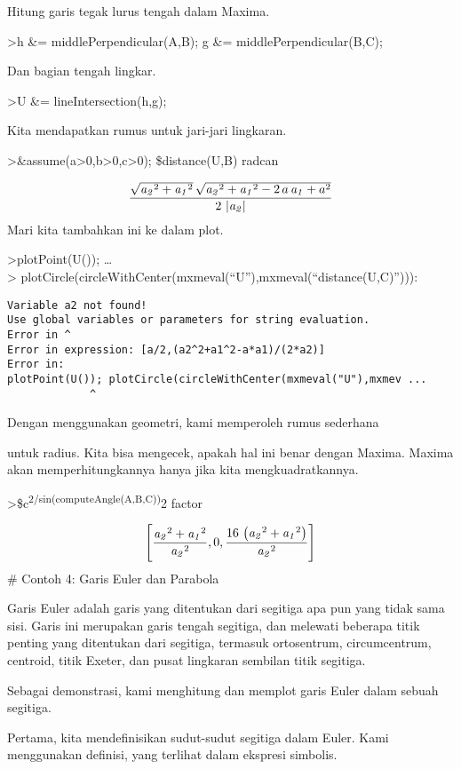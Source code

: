 \documentclass[
]{book}
\begin{document}
Hitung garis tegak lurus tengah dalam Maxima.

\textgreater h \&= middlePerpendicular(A,B); g \&= middlePerpendicular(B,C);

Dan bagian tengah lingkar.

\textgreater U \&= lineIntersection(h,g);

Kita mendapatkan rumus untuk jari-jari lingkaran.

\textgreater\&assume(a\textgreater0,b\textgreater0,c\textgreater0); \$distance(U,B) \textbar{} radcan

\[\frac{\sqrt{{\it a_2}^2+{\it a_1}^2}\,\sqrt{{\it a_2}^2+{\it a_1}^2
 -2\,a\,{\it a_1}+a^2}}{2\,\left| {\it a_2}\right| }\]Mari kita tambahkan ini ke dalam plot.

\textgreater plotPoint(U()); \ldots{}\\
\textgreater{} plotCircle(circleWithCenter(mxmeval(``U''),mxmeval(``distance(U,C)''))):

\begin{verbatim}
Variable a2 not found!
Use global variables or parameters for string evaluation.
Error in ^
Error in expression: [a/2,(a2^2+a1^2-a*a1)/(2*a2)]
Error in:
plotPoint(U()); plotCircle(circleWithCenter(mxmeval("U"),mxmev ...
             ^
\end{verbatim}

Dengan menggunakan geometri, kami memperoleh rumus sederhana

untuk radius. Kita bisa mengecek, apakah hal ini benar dengan Maxima. Maxima akan memperhitungkannya hanya jika kita mengkuadratkannya.

\textgreater\$c\textsuperscript{2/sin(computeAngle(A,B,C))}2 \textbar{} factor

\[\left[ \frac{{\it a_2}^2+{\it a_1}^2}{{\it a_2}^2} , 0 , \frac{16\,
 \left({\it a_2}^2+{\it a_1}^2\right)}{{\it a_2}^2} \right] \]\# Contoh 4: Garis Euler dan Parabola

Garis Euler adalah garis yang ditentukan dari segitiga apa pun yang tidak sama sisi. Garis ini merupakan garis tengah segitiga, dan melewati beberapa titik penting yang ditentukan dari segitiga, termasuk ortosentrum, circumcentrum, centroid, titik Exeter, dan pusat lingkaran sembilan titik segitiga.

Sebagai demonstrasi, kami menghitung dan memplot garis Euler dalam sebuah segitiga.

Pertama, kita mendefinisikan sudut-sudut segitiga dalam Euler. Kami menggunakan definisi, yang terlihat dalam ekspresi simbolis.
\end{document}
